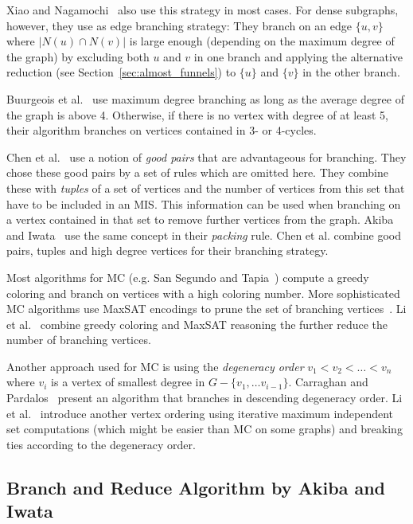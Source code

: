\documentclass[a4paper,UKenglish,cleveref, autoref, thm-restate]{lipics-v2021}
\begin{document}
Xiao and Nagamochi~\cite{XiaoNagamochi} also use
this strategy in most cases. For dense subgraphs, however, they use as edge
branching strategy: They branch on an edge $\{u, v\}$ where $|N(u) \cap N(v)|$
is large enough (depending on the maximum degree of the graph) by
excluding both $u$ and $v$ in one branch and applying the alternative reduction
(see Section~\ref{sec:almost_funnels}) to $\{u\}$ and $\{v\}$ in the other branch.

Buurgeois et al.~\cite{Bourgeois} use maximum degree branching as long as the
average degree of the graph is above 4. Otherwise, if there is no vertex with degree of at least 5, their algorithm branches on vertices
contained in 3- or 4-cycles. 

Chen et al.~\cite{ChenXiaKanj} use a notion of \emph{good pairs} that are advantageous
for branching. They chose these good pairs by a set of rules which are omitted
here. They combine these with \emph{tuples} of a set of vertices and the
number of vertices from this set that have to be included in an MIS. This
information can be used when branching on a vertex
contained in that set to remove further vertices from the graph. Akiba and
Iwata~\cite{AkibaIwata} use the same concept in their \emph{packing} rule. Chen
et al. combine good pairs, tuples and high degree vertices for their branching strategy.

Most algorithms for MC (e.g. San Segundo and Tapia~\cite{Color}) compute a
greedy coloring and branch on vertices with a high coloring number.
More sophisticated MC algorithms use MaxSAT encodings to prune the set of
branching vertices~\cite{LiFangXu,LiJiang,LiQuan}. Li et al.~\cite{LiMaxSat}
combine greedy coloring and MaxSAT reasoning the further reduce the number of
branching vertices.

Another approach used for MC is using the \emph{degeneracy order} $v_1 < v_2 <
\dots < v_n$ where $v_i$ is a vertex of smallest degree in $G - \{v_1, \dots
v_{i-1}\}$. Carraghan and Pardalos~\cite{CarraghanPardalos} present an algorithm
that branches in descending degeneracy order. Li et al.~\cite{LiFangXu}
introduce another vertex ordering using iterative maximum independent set
computations (which might be easier than MC on some graphs) and breaking ties
according to the degeneracy order.

\subsection{Branch and Reduce Algorithm by Akiba and Iwata~\cite{AkibaIwata}}
\end{document}
